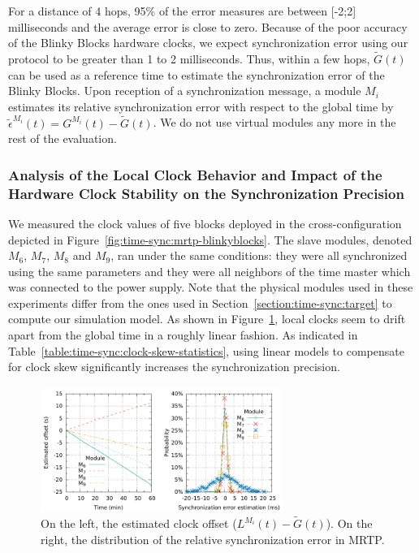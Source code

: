 For a distance of 4 hops, 95\% of the error measures are between [-2;2] milliseconds and the average error is close to zero. Because of the poor accuracy of the Blinky Blocks hardware clocks, we expect synchronization error using our protocol to be greater than 1 to 2 milliseconds. Thus, within a few hops, $\tilde{G}(t)$ can be used as a reference time to estimate the synchronization error of the Blinky Blocks. Upon reception of a synchronization message, a module ${M_i}$ estimates its relative synchronization error with respect to the global time by $\tilde{\epsilon}^{M_i}(t) = G^{M_i}(t) - \tilde{G}(t)$. We do not use virtual modules any more in the rest of the evaluation.

\subsubsection{Analysis of the Local Clock Behavior and Impact of the Hardware Clock Stability on the Synchronization Precision}

We measured the clock values of five blocks deployed in the cross-configuration depicted in Figure~\ref{fig:time-sync:mrtp-blinkyblocks}. The slave modules, denoted $M_6$, $M_7$, $M_8$ and $M_9$, ran under the same conditions: they were all synchronized using the same parameters and they were all neighbors of the time master which was connected to the power supply. Note that the physical modules used in these experiments differ from the ones used in Section~\ref{section:time-sync:target} to compute our simulation model. As shown in Figure~\ref{fig:time-sync:hardware-instability-density}, local clocks seem to drift apart from the global time in a roughly linear fashion. As indicated in Table~\ref{table:time-sync:clock-skew-statistics}, using linear models to compensate for clock skew significantly increases the synchronization precision. 

\begin{figure}[h!]
	\begin{center}
		\includegraphics[width=0.7\textwidth]{images/time-synchronization/stability-results.pdf}
	\end{center}
	\caption{On the left, the estimated clock offset ($L^{M_i}(t) - \tilde{G}(t)$). On the right, the distribution of the relative synchronization error in MRTP.\label{fig:time-sync:hardware-instability-density}}
\end{figure}


